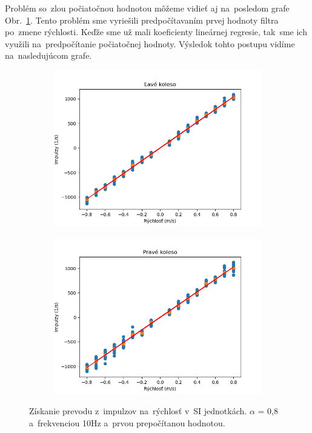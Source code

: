Problém so~zlou počiatočnou hodnotou môžeme vidieť aj na~posledom grafe Obr.~\ref{fig:rw_lw_08100}. Tento problém sme vyriešili
predpočítavaním prvej hodnoty filtra po~zmene rýchlosti. Keďže sme už mali koeficienty lineárnej regresie, tak~sme ich využili
na~predpočítanie počiatočnej hodnoty. Výsledok tohto postupu vidíme na~nasledujúcom grafe.

\begin{figure}[!htbp]
	\begin{subfigure}{0.5\textwidth}
		\includegraphics[width=\textwidth]{img/lw_08100_3.png}
	\end{subfigure}
	\hfill
	\begin{subfigure}{0.5\textwidth}
		\includegraphics[width=\textwidth]{img/rw_08100_3.png}
	\end{subfigure}
	\caption{Získanie prevodu z~impulzov na~rýchlosť v~SI jednotkách. $\alpha$ = 0,8 a~frekvenciou 10Hz a~prvou prepočítanou hodnotou.}
	\label{fig:rw_lw_08100}
\end{figure}

